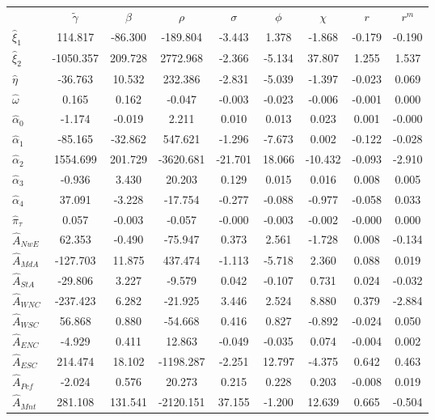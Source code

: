 \begin{tabular}{l*{8}{c}} \toprule 
& ${\tilde{\gamma}}$ & ${\beta}$ & ${\rho}$ & ${\sigma}$ & ${\phi}$ & ${\chi}$ & ${r}$ & ${r}^m$ \\ \cmidrule(lr){2-9} 
  $\hat{\xi}_1$ & 114.817 & -86.300 & -189.804 & -3.443 & 1.378 & -1.868 & -0.179 & -0.190 \\ 
  $\hat{\xi}_2$ & -1050.357 & 209.728 & 2772.968 & -2.366 & -5.134 & 37.807 & 1.255 & 1.537 \\ 
  $\hat{\eta}$ & -36.763 & 10.532 & 232.386 & -2.831 & -5.039 & -1.397 & -0.023 & 0.069 \\ 
  $\hat{\omega}$ & 0.165 & 0.162 & -0.047 & -0.003 & -0.023 & -0.006 & -0.001 & 0.000 \\ 
  $\hat{\alpha}_0$ & -1.174 & -0.019 & 2.211 & 0.010 & 0.013 & 0.023 & 0.001 & -0.000 \\ 
  $\hat{\alpha}_1$ & -85.165 & -32.862 & 547.621 & -1.296 & -7.673 & 0.002 & -0.122 & -0.028 \\ 
  $\hat{\alpha}_2$ & 1554.699 & 201.729 & -3620.681 & -21.701 & 18.066 & -10.432 & -0.093 & -2.910 \\ 
  $\hat{\alpha}_3$ & -0.936 & 3.430 & 20.203 & 0.129 & 0.015 & 0.016 & 0.008 & 0.005 \\ 
  $\hat{\alpha}_4$ & 37.091 & -3.228 & -17.754 & -0.277 & -0.088 & -0.977 & -0.058 & 0.033 \\ 
  $\hat{\pi}_{\tau}$ & 0.057 & -0.003 & -0.057 & -0.000 & -0.003 & -0.002 & -0.000 & 0.000 \\ 
  $\hat{A}_{NwE}$ & 62.353 & -0.490 & -75.947 & 0.373 & 2.561 & -1.728 & 0.008 & -0.134 \\ 
  $\hat{A}_{MdA}$ & -127.703 & 11.875 & 437.474 & -1.113 & -5.718 & 2.360 & 0.088 & 0.019 \\ 
  $\hat{A}_{StA}$ & -29.806 & 3.227 & -9.579 & 0.042 & -0.107 & 0.731 & 0.024 & -0.032 \\ 
  $\hat{A}_{WNC}$ & -237.423 & 6.282 & -21.925 & 3.446 & 2.524 & 8.880 & 0.379 & -2.884 \\ 
  $\hat{A}_{WSC}$ & 56.868 & 0.880 & -54.668 & 0.416 & 0.827 & -0.892 & -0.024 & 0.050 \\ 
  $\hat{A}_{ENC}$ & -4.929 & 0.411 & 12.863 & -0.049 & -0.035 & 0.074 & -0.004 & 0.002 \\ 
  $\hat{A}_{ESC}$ & 214.474 & 18.102 & -1198.287 & -2.251 & 12.797 & -4.375 & 0.642 & 0.463 \\ 
  $\hat{A}_{Pcf}$ & -2.024 & 0.576 & 20.273 & 0.215 & 0.228 & 0.203 & -0.008 & 0.019 \\ 
  $\hat{A}_{Mnt}$ & 281.108 & 131.541 & -2120.151 & 37.155 & -1.200 & 12.639 & 0.665 & -0.504 \\ 
 \bottomrule 
 \end{tabular}